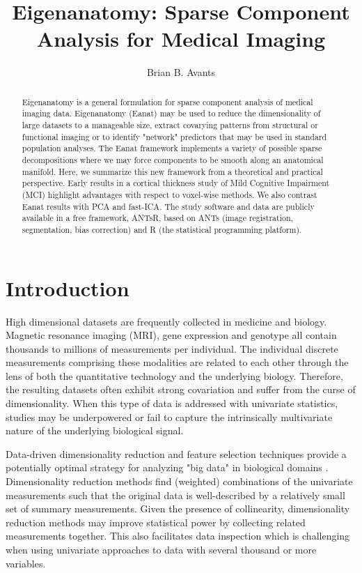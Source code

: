 \documentclass{elsarticle}\usepackage{graphicx, color}
\begin{document}
\title{Eigenanatomy: Sparse Component Analysis for Medical Imaging}
\author{Brian B. Avants}
\begin{abstract}
Eigenanatomy is a general formulation for sparse component analysis of
medical imaging data.  Eigenanatomy (Eanat) may be used to reduce the
dimensionality of large datasets to a manageable size, extract
covarying patterns from structural or functional imaging or to
identify "network" predictors that may be used in standard population
analyses.  The Eanat framework implements a variety of possible sparse
decompositions where we may force components to be smooth along an
anatomical manifold.  Here, we summarize this new framework from a
theoretical and practical perspective.  Early results in a cortical
thickness study of Mild Cognitive Impairment (MCI) highlight
advantages with respect to voxel-wise methods.  We also contrast Eanat
results with PCA and fast-ICA.  The study software and data are
publicly available in a free framework, ANTsR, based on ANTs (image
registration, segmentation, bias correction) and R
(the statistical programming platform).
\end{abstract}
\maketitle
\section{Introduction}
High dimensional datasets are frequently collected in medicine and
biology.  Magnetic resonance imaging (MRI), gene expression and
genotype all contain thousands to millions of measurements per
individual.  The individual discrete measurements comprising these
modalities are related to each other through the lens of both the
quantitative technology and the underlying biology.  Therefore, the
resulting datasets often exhibit strong covariation and suffer from
the curse of dimensionality.  When this type of data is addressed with
univariate statistics, studies may be underpowered or fail to capture
the intrinsically multivariate nature of the underlying biological
signal.

Data-driven dimensionality reduction and feature selection techniques
provide a potentially optimal strategy for analyzing "big data" in
biological domains \cite{}.  Dimensionality reduction methods find
(weighted) combinations of the univariate measurements such that the
original data is well-described by a relatively small set of summary
measurements.  Given the presence of collinearity, dimensionality
reduction methods may improve statistical power by collecting related
measurements together.  This also facilitates data inspection which is
challenging when using univariate approaches to data with several
thousand or more variables.
\end{document}
